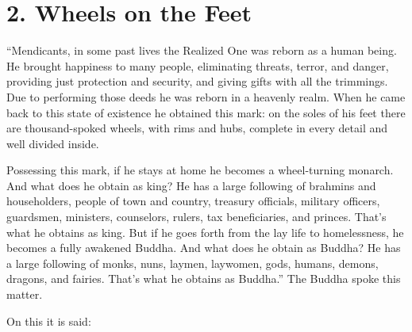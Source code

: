 \documentclass[12pt,openany]{book}%
\begin{document}
\section*{2. Wheels on the Feet }

“Mendicants, in some past lives the Realized One was reborn as a human being. He brought happiness to many people, eliminating threats, terror, and danger, providing just protection and security, and giving gifts with all the trimmings. Due to performing those deeds he was reborn in a heavenly realm. When he came back to this state of existence he obtained this mark: on the soles of his feet there are thousand-spoked wheels, with rims and hubs, complete in every detail and well divided inside. 

Possessing this mark, if he stays at home he becomes a wheel-turning monarch. And what does he obtain as king? He has a large following of brahmins and householders, people of town and country, treasury officials, military officers, guardsmen, ministers, counselors, rulers, tax beneficiaries, and princes. That’s what he obtains as king. But if he goes forth from the lay life to homelessness, he becomes a fully awakened Buddha. And what does he obtain as Buddha? He has a large following of monks, nuns, laymen, laywomen, gods, humans, demons, dragons, and fairies. That’s what he obtains as Buddha.” The Buddha spoke this matter. 

On this it is said: 
\end{document}
